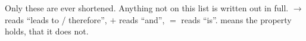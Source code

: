 
{\color{sub}\footnotesize Only these are ever shortened. Anything not on this list is written
out in full. $\rightarrow$ reads ``leads to / therefore'', $+$ reads ``and'', $=$ reads
``is''. \checkmark means the property holds, \xmark that it does not.}

